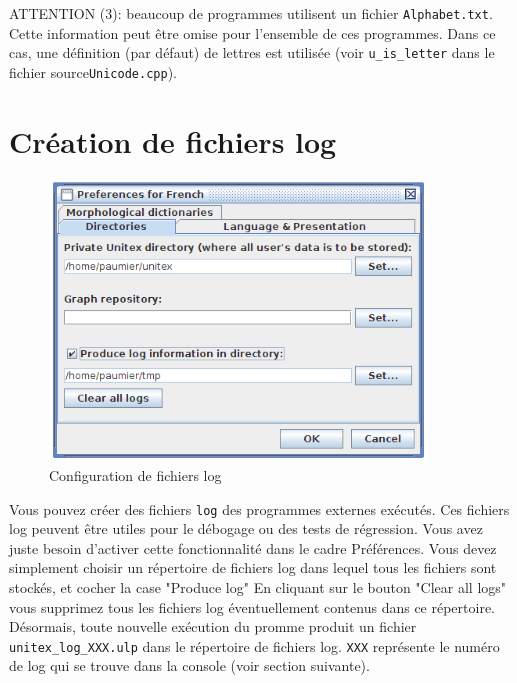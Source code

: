 \bigskip
\noindent ATTENTION (3): beaucoup de programmes utilisent un fichier \verb+Alphabet.txt+. Cette
information peut être omise pour l'ensemble de ces programmes. Dans ce cas, une définition (par
défaut) de lettres est utilisée (voir \verb+u_is_letter+ dans le fichier source\verb$Unicode.cpp$).


\section{Création de fichiers log}
\label{section-creating-log-files}

\bigskip
\begin{figure}[!h]
\begin{center}
\includegraphics[width=10cm]{resources/img/fig11-1a.png}
\caption{Configuration de fichiers log\label{fig-logging-config}}
\end{center}
\end{figure}

Vous pouvez créer des fichiers \verb+log+ des programmes externes exécutés.
Ces fichiers log peuvent être utiles pour le débogage ou des tests de régression. Vous avez juste
besoin d'activer cette fonctionnalité dans le cadre Préférences. Vous devez simplement choisir un
répertoire de fichiers log dans lequel tous les fichiers sont stockés, et cocher la case "Produce
log"
En cliquant sur le bouton "Clear all logs" vous supprimez tous les fichiers log éventuellement
contenus dans ce répertoire. Désormais, toute nouvelle exécution du promme produit un fichier
\verb+unitex_log_XXX.ulp+ dans le répertoire de fichiers log. \verb+XXX+ représente le numéro de
log qui se trouve dans la console (voir section suivante).



